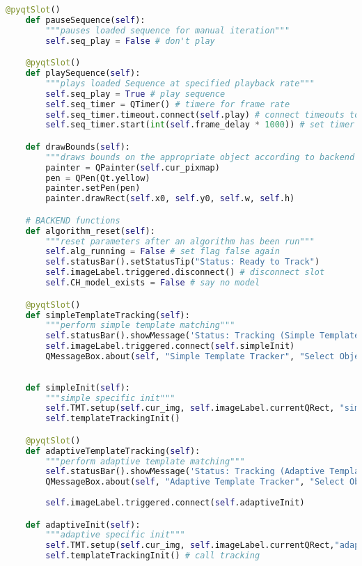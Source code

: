 \begin{lstlisting}[language=Python, caption={GUI Impementation Code}, captionpos=b, label={lst:gui}]
    @pyqtSlot()
    def pauseSequence(self):
        """pauses loaded sequence for manual iteration"""
        self.seq_play = False # don't play 

    @pyqtSlot()
    def playSequence(self):
        """plays loaded Sequence at specified playback rate""" 
        self.seq_play = True # play sequence
        self.seq_timer = QTimer() # timere for frame rate
        self.seq_timer.timeout.connect(self.play) # connect timeouts to fetching next image
        self.seq_timer.start(int(self.frame_delay * 1000)) # set timer countdown rate

    def drawBounds(self):
        """draws bounds on the appropriate object according to backend coordinates"""
        painter = QPainter(self.cur_pixmap)
        pen = QPen(Qt.yellow)
        painter.setPen(pen)
        painter.drawRect(self.x0, self.y0, self.w, self.h)

    # BACKEND functions 
    def algorithm_reset(self):
        """reset parameters after an algorithm has been run"""
        self.alg_running = False # set flag false again
        self.statusBar().setStatusTip("Status: Ready to Track")
        self.imageLabel.triggered.disconnect() # disconnect slot
        self.CH_model_exists = False # say no model

    @pyqtSlot()
    def simpleTemplateTracking(self):
        """perform simple template matching"""
        self.statusBar().showMessage('Status: Tracking (Simple Template)') 
        self.imageLabel.triggered.connect(self.simpleInit)
        QMessageBox.about(self, "Simple Template Tracker", "Select Object to Track") 
            
    
    def simpleInit(self):
        """simple specific init"""
        self.TMT.setup(self.cur_img, self.imageLabel.currentQRect, "simple") # setup simple tracking
        self.templateTrackingInit()

    @pyqtSlot()
    def adaptiveTemplateTracking(self):
        """perform adaptive template matching"""    
        self.statusBar().showMessage('Status: Tracking (Adaptive Template)')
        QMessageBox.about(self, "Adaptive Template Tracker", "Select Object to Track") 
            
        self.imageLabel.triggered.connect(self.adaptiveInit) 

    def adaptiveInit(self):
        """adaptive specific init"""
        self.TMT.setup(self.cur_img, self.imageLabel.currentQRect,"adaptive") # setup adaptive tracking
        self.templateTrackingInit() # call tracking


\end{lstlisting}
